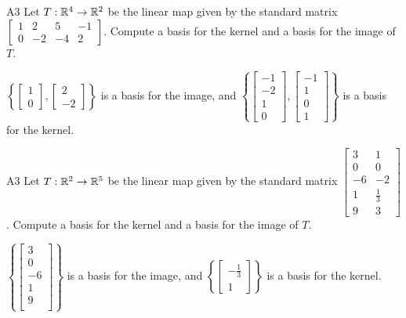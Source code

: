 \begin{problem}{A3}
Let $T: \mathbb{R}^4 \rightarrow \mathbb{R}^2$ be the linear map given by the standard matrix
\(
  \begin{bmatrix}
    1 & 2 & 5 & -1 \\
    0 & -2 & -4 & 2
  \end{bmatrix}
\). Compute a basis for the kernel and a basis for the image of $T$.
\end{problem}
\begin{solution}
\(\left\{
  \begin{bmatrix} 1 \\ 0  \end{bmatrix},
  \begin{bmatrix} 2 \\ -2 \end{bmatrix}
\right\} \) is a basis for the image, and \(\left\{
  \begin{bmatrix} -1 \\ -2 \\ 1 \\ 0 \end{bmatrix},
  \begin{bmatrix} -1 \\ 1 \\ 0 \\ 1 \end{bmatrix}
\right\} \) is a basis for the kernel.
\end{solution}


\begin{problem}{A3}
Let $T: \mathbb{R}^2 \rightarrow \mathbb{R}^5$ be the linear map given by the standard matrix
\(
  \begin{bmatrix}
    3 & 1 \\
    0 & 0 \\
    -6 & -2 \\
    1 & \frac{1}{3} \\
    9 & 3
  \end{bmatrix}
\). Compute a basis for the kernel and a basis for the image of $T$.
\end{problem}
\begin{solution}
\(\left\{
\begin{bmatrix}
  3  \\
  0  \\
  -6 \\
  1 \\
  9 \\
\end{bmatrix}
\right\} \) is a basis for the image, and \(\left\{
  \begin{bmatrix} -\frac{1}{3} \\ 1\end{bmatrix}
\right\} \) is a basis for the kernel.
\end{solution}

